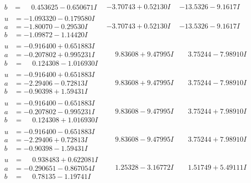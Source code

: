 \documentclass[1p]{elsarticle_modified}
\theoremstyle{definition}
\begin{document}
$$\begin{array}{c|c|c}
\begin{aligned}
b &= \phantom{-}0.453625 - 0.650671 I\end{aligned}
 & -3.70743 + 0.52130 I & -13.5326 - 9.1617 I \\ \hline\begin{aligned}
u &= -1.093320 - 0.179580 I \\
a &= -1.80070 - 0.29530 I \\
b &= -1.09872 - 1.14420 I\end{aligned}
 & -3.70743 + 0.52130 I & -13.5326 - 9.1617 I \\ \hline\begin{aligned}
u &= -0.916400 + 0.651883 I \\
a &= -0.207802 + 0.995231 I \\
b &= \phantom{-}0.124308 - 1.016930 I\end{aligned}
 & \phantom{-}9.83608 + 9.47995 I & \phantom{-}3.75244 - 7.98910 I \\ \hline\begin{aligned}
u &= -0.916400 + 0.651883 I \\
a &= -2.29406 - 0.72813 I \\
b &= -0.90398 + 1.59431 I\end{aligned}
 & \phantom{-}9.83608 + 9.47995 I & \phantom{-}3.75244 - 7.98910 I \\ \hline\begin{aligned}
u &= -0.916400 - 0.651883 I \\
a &= -0.207802 - 0.995231 I \\
b &= \phantom{-}0.124308 + 1.016930 I\end{aligned}
 & \phantom{-}9.83608 - 9.47995 I & \phantom{-}3.75244 + 7.98910 I \\ \hline\begin{aligned}
u &= -0.916400 - 0.651883 I \\
a &= -2.29406 + 0.72813 I \\
b &= -0.90398 - 1.59431 I\end{aligned}
 & \phantom{-}9.83608 - 9.47995 I & \phantom{-}3.75244 + 7.98910 I \\ \hline\begin{aligned}
u &= \phantom{-}0.938483 + 0.622081 I \\
a &= -0.290651 - 0.867054 I \\
b &= \phantom{-}0.78135 - 1.19741 I\end{aligned}
 & \phantom{-}1.25328 - 3.16772 I & \phantom{-}1.51749 + 5.49111 I \\ \hline\begin{aligned}

\end{aligned}
\end{array}$$
\end{document}
